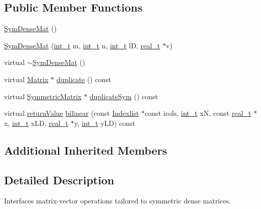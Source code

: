 \subsection*{Public Member Functions}
\begin{DoxyCompactItemize}
\item 
\hyperlink{class_sym_dense_mat_a6e733eae71c243aeca8218216235cc6a}{Sym\+Dense\+Mat} ()
\item 
\hyperlink{class_sym_dense_mat_a158c75695d197782ef488cda8dbcd2fb}{Sym\+Dense\+Mat} (\hyperlink{_types_8hpp_ab6fd6105e64ed14a0c9281326f05e623}{int\+\_\+t} m, \hyperlink{_types_8hpp_ab6fd6105e64ed14a0c9281326f05e623}{int\+\_\+t} n, \hyperlink{_types_8hpp_ab6fd6105e64ed14a0c9281326f05e623}{int\+\_\+t} lD, \hyperlink{qp_o_a_s_e_s__wrapper_8h_a0d00e2b3dfadee81331bbb39068570c4}{real\+\_\+t} $\ast$v)
\item 
virtual \hyperlink{class_sym_dense_mat_af3b9bd2c0de61206176058e3ccd49321}{$\sim$\+Sym\+Dense\+Mat} ()
\item 
virtual \hyperlink{class_matrix}{Matrix} $\ast$ \hyperlink{class_sym_dense_mat_a432a0e30f0440983d32d225759ac9936}{duplicate} () const
\item 
virtual \hyperlink{class_symmetric_matrix}{Symmetric\+Matrix} $\ast$ \hyperlink{class_sym_dense_mat_abbb79b4991d4fc1dde962dff52fec198}{duplicate\+Sym} () const
\item 
virtual \hyperlink{_message_handling_8hpp_a81d556f613bfbabd0b1f9488c0fa865e}{return\+Value} \hyperlink{class_sym_dense_mat_aea2b47399c24ea9866238f2107be4525}{bilinear} (const \hyperlink{class_indexlist}{Indexlist} $\ast$const icols, \hyperlink{_types_8hpp_ab6fd6105e64ed14a0c9281326f05e623}{int\+\_\+t} xN, const \hyperlink{qp_o_a_s_e_s__wrapper_8h_a0d00e2b3dfadee81331bbb39068570c4}{real\+\_\+t} $\ast$x, \hyperlink{_types_8hpp_ab6fd6105e64ed14a0c9281326f05e623}{int\+\_\+t} x\+LD, \hyperlink{qp_o_a_s_e_s__wrapper_8h_a0d00e2b3dfadee81331bbb39068570c4}{real\+\_\+t} $\ast$y, \hyperlink{_types_8hpp_ab6fd6105e64ed14a0c9281326f05e623}{int\+\_\+t} y\+LD) const
\end{DoxyCompactItemize}
\subsection*{Additional Inherited Members}


\subsection{Detailed Description}
Interfaces matrix-\/vector operations tailored to symmetric dense matrices. 

